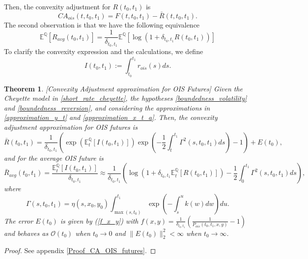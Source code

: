 \documentclass[a4paper,10pt]{article}
\newtheorem{theorem}{Theorem}[section]
\newcommand{\1}{\mathbf{1}}
\begin{document}
Then, the convexity adjustment for $ R(t_0,t_1)$ is
\begin{equation}\label{R_ois_ca}
CA_{ois}(t,t_0,t_1) = F(t,t_0,t_1) - \bar{R}(t,t_0,t_1).
\end{equation}
The second observation is that we have the following equivalence
\begin{equation}\label{R_ois_avg}
\mathbb{E}^{\mathbb{Q}}\left[R_{avg}(t_0,t_1) \right] =\frac{1}{\delta_{t_0,t_1}} \mathbb{E}^{\mathbb{Q}}\left[ \log\left(1+ \delta_{t_0,t_1} R(t_0,t_1) \right) \right]  \end{equation}
To clarify the convexity expression and the calculations, we define 
\begin{equation*}
I(t_0,t_1) := \int_{t_0}^{t_1} r_{ois}(s) ds.
\end{equation*}

\begin{theorem}\label{Th_CA_OIS}[Convexity Adjustment approximation for OIS Futures]
Given the Cheyette model in \eqref{short_rate_cheyette}, the hypotheses \ref{boundedness_volatility} and \ref{boundedness_reversion}, and considering the approximations in \eqref{approximation_y_t} and \eqref{approximation_x_t_a}. Then, the convexity adjustment approximation for OIS futures is 
\begin{equation}\label{convexity_ois_future}
\bar{R}(t_0,t_1) = \frac{1}{\delta_{t_0,t_1}}\left(\exp\left(\mathbb{E}_t^{\mathbb{Q}}\left[I(t_0,t_1)\right]\right)\exp\left(-\frac{1}{2}\int_{t}^{t_1}\Gamma^{2}(s,t_0,t_1) ds\right) - 1\right) + E(t_0),
\end{equation}
and for the average OIS future is
\begin{equation}\label{convexity_avg_ois_future}
\bar{R}_{avg}(t_0,t_1) = \frac{\mathbb{E}_t^{\mathbb{Q}}\left[I(t_0,t_1)\right] }{\delta_{t_0,t_1}} \approx \frac{1}{\delta_{t_0,t_1}}\left(\log\left(1+\delta_{t_0,t_1}  \mathbb{E}_t^{\mathbb{Q}}\left[R(t_0,t_1)\right] \right) - \frac{1}{2}\int_{0}^{t_1}  \Gamma^{2}(s,t_0,t_1) ds\right),
\end{equation}
where 
\begin{equation}
\Gamma(s,t_0,t_1)= \eta(s,x_0,y_0)\int_{\max(s, t_{0})}^{t_1} \exp\left( -\int_{s}^{u} k(w) dw\right)du.
\end{equation}
The error $E(t_0)$ is given by (\ref{f_x_y}) with $f(x,y)=\frac{1}{\delta_{t_0,t_1}}\left(\frac{1}{P_{ois}(t_0,t_1,x,y)} -1\right)$ and behaves as $\mathcal{O}(t_0)$ when $t_0 \to 0$ and $\|E(t_0)\|^{2}_{2} < \infty$ when $t_0 \to \infty$.
\end{theorem}
\begin{proof}
See appendix \ref{Proof_CA_OIS_futures}.
\end{proof}
\end{document}
